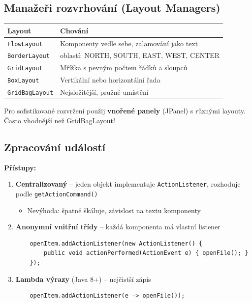 \documentclass[11pt,a4paper]{article}
\begin{document}
\subsection{Manažeři rozvrhování (Layout Managers)}

\begin{center}
\begin{tabular}{>{\raggedright}p{2.5cm} >{\raggedright\arraybackslash}p{10cm}}
\toprule
\textbf{Layout} & \textbf{Chování} \\
\midrule
\texttt{FlowLayout} & Komponenty vedle sebe, zalamování jako text \\
\texttt{BorderLayout} & 5 oblastí: NORTH, SOUTH, EAST, WEST, CENTER \\
\texttt{GridLayout} & Mřížka s pevným počtem řádků a sloupců \\
\texttt{BoxLayout} & Vertikální nebo horizontální řada \\
\texttt{GridBagLayout} & Nejsložitější, pružné umístění \\
\bottomrule
\end{tabular}
\end{center}

\begin{tcolorbox}[tipbox,title=Vnořené kontejnery]
Pro sofistikované rozvržení použij \textbf{vnořené panely} (JPanel) s různými layouty. Často vhodnější než GridBagLayout!
\end{tcolorbox}

\subsection{Zpracování událostí}

\textbf{Přístupy:}

\begin{enumerate}
    \item \textbf{Centralizovaný} -- jeden objekt implementuje \texttt{ActionListener}, rozhoduje podle \texttt{getActionCommand()}
    \begin{itemize}
        \item Nevýhoda: špatně škáluje, závislost na textu komponenty
    \end{itemize}
    
    \item \textbf{Anonymní vnitřní třídy} -- každá komponenta má vlastní listener
    \begin{verbatim}
    openItem.addActionListener(new ActionListener() {
        public void actionPerformed(ActionEvent e) { openFile(); }
    });
    \end{verbatim}
    
    \item \textbf{Lambda výrazy} (Java 8+) -- nejčistší zápis
    \begin{verbatim}
    openItem.addActionListener(e -> openFile());
    \end{verbatim}
\end{enumerate}
\end{document}
